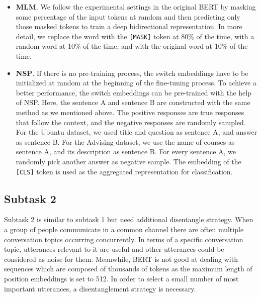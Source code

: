 \documentclass[letterpaper]{article} \usepackage{aaai20}  \usepackage{times}  \usepackage{helvet} \usepackage{courier}  \usepackage[hyphens]{url}  \usepackage{graphicx} \urlstyle{rm} \def\UrlFont{\rm}  \usepackage{graphicx}  \frenchspacing  \setlength{\pdfpagewidth}{8.5in}  \setlength{\pdfpageheight}{11in}
\begin{document}
    \begin{itemize}
      \item \textbf{MLM}.
            We follow the experimental settings in the original BERT by masking some percentage of the input tokens at random and then predicting only those masked tokens to train a deep bidirectional representation.
            In more detail, we replace the word with the \texttt{[MASK]} token at 80\% of the time, with a random word at 10\% of the time, and with the original word at 10\% of the time.
      \item \textbf{NSP}.
            If there is no pre-training process, the switch embeddings have to be initialized at random at the beginning of the fine-tuning process.
            To achieve a better performance, the switch embeddings can be pre-trained with the help of NSP.
            Here, the sentence A and sentence B are constructed with the same method as we mentioned above.
            The positive responses are true responses that follow the context, and the negative responses are randomly sampled.
            For the Ubuntu dataset, we used title and question as sentence A, and answer as sentence B.
            For the Advising dataset, we use the name of courses as sentence A, and its description as sentence B.
            For every sentence A, we randomly pick another answer as negative sample.
            The embedding of the \texttt{[CLS]} token is used as the aggregated representation for classification.
    \end{itemize}


  \subsection{Subtask 2}
    Subtask 2 is similar to subtask 1 but need additional disentangle strategy.
    When a group of people communicate in a common channel there are often multiple conversation topics occurring concurrently.
    In terms of a specific conversation topic, utterances relevant to it are useful and other utterances could be considered as noise for them.
    Meanwhile, BERT is not good at dealing with sequences which are composed of thousands of tokens as the maximum length of position embeddings is set to 512.
    In order to select a small number of most important utterances, a disentanglement strategy is necessary.
\end{document}
